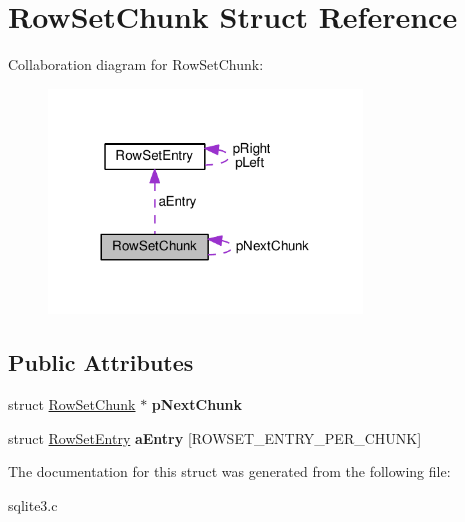 \hypertarget{structRowSetChunk}{}\section{Row\+Set\+Chunk Struct Reference}
\label{structRowSetChunk}


Collaboration diagram for Row\+Set\+Chunk\+:\nopagebreak
\begin{figure}[H]
\begin{center}
\leavevmode
\includegraphics[width=236pt]{structRowSetChunk__coll__graph}
\end{center}
\end{figure}
\subsection*{Public Attributes}
\begin{DoxyCompactItemize}
\item 
struct \hyperlink{structRowSetChunk}{Row\+Set\+Chunk} $\ast$ {\bfseries p\+Next\+Chunk}\hypertarget{structRowSetChunk_ae8f0975c86633ae2bb8b212d3a767554}{}\label{structRowSetChunk_ae8f0975c86633ae2bb8b212d3a767554}

\item 
struct \hyperlink{structRowSetEntry}{Row\+Set\+Entry} {\bfseries a\+Entry} \mbox{[}R\+O\+W\+S\+E\+T\+\_\+\+E\+N\+T\+R\+Y\+\_\+\+P\+E\+R\+\_\+\+C\+H\+U\+NK\mbox{]}\hypertarget{structRowSetChunk_abde97bbb07c3bf9454e719ff860bdd1f}{}\label{structRowSetChunk_abde97bbb07c3bf9454e719ff860bdd1f}

\end{DoxyCompactItemize}


The documentation for this struct was generated from the following file\+:\begin{DoxyCompactItemize}
\item 
sqlite3.\+c\end{DoxyCompactItemize}
